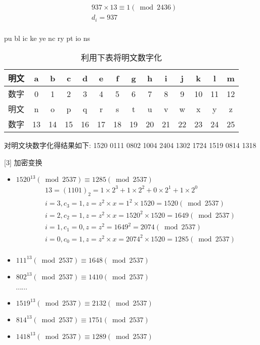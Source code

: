 \documentclass[UTF8]{ctexart}
\begin{document}
    $$
    \begin{aligned}
        &937\times 13\equiv 1(\bmod 2436)\\
        &d_i=937\\
    \end{aligned}
    $$

    pu bl ic ke ye nc ry pt io ns

    \begin{table}[h]
        \centering
        \caption{利用下表将明文数字化}
        \begin{tabular}{|c|c|c|c|c|c|c|c|c|c|c|c|c|c|}
            \hline
            明文 &a &b &c &d &e &f &g &h &i &j &k &l &m\\
            \hline
            数字 &0 &1 &2 &3 &4 &5 &6 &7 &8 &9 &10 &11 &12\\
            \hline
            \hline
            明文 &n &o &p &q &r &s &t &u &v &w &x &y &z\\
            \hline
            数字 &13 &14 &15 &16 &17 &18 &19 &20 &21 &22 &23 &24 &25\\
            \hline
        \end{tabular}
    \end{table}

    对明文块数字化得结果如下:
    1520 0111 0802 1004 2404 1302 1724 1519 0814 1318

    [3] 加密变换
    \begin{itemize}
        \item $1520^{13}(\bmod 2537)\equiv 1285(\bmod 2537)$
        $$
        \begin{aligned}
            &13=(1101)_2=1\times 2^3+1\times 2^2+0\times 2^1+1\times 2^0\\
            &i=3, c_3=1, z=z^2\times x=1^2\times 1520=1520(\bmod 2537)\\
            &i=2, c_2=1, z=z^2\times x=1520^2\times 1520=1649(\bmod 2537)\\
            &i=1, c_1=0, z=z^2=1649^2=2074(\bmod 2537)\\
            &i=0, c_0=1, z=z^2\times x=2074^2\times 1520=1285(\bmod 2537)\\
        \end{aligned}
        $$
        \item $111^{13}(\bmod 2537)\equiv 1648(\bmod 2537)$
        \item $802^{13}(\bmod 2537)\equiv 1410(\bmod 2537)$

        $\cdots \cdots$

        \item $1519^{13}(\bmod 2537)\equiv 2132(\bmod 2537)$
        \item $814^{13}(\bmod 2537)\equiv 1751(\bmod 2537)$
        \item $1418^{13}(\bmod 2537)\equiv 1289(\bmod 2537)$
    \end{itemize}
\end{document}
